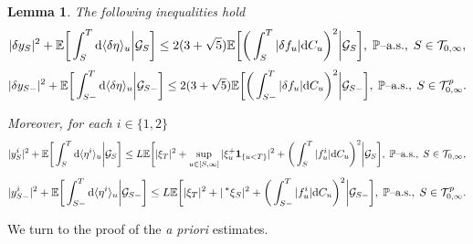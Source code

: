 \documentclass[10pt]{article} %
\newtheorem{lemma}[theorem]{Lemma}
\newcommand\cG{\mathcal G}
\newcommand\cT{\mathcal T}
\def \E{\mathbb{E}}
\def \P{\mathbb{P}}
\newcommand{\brs}[1]{\prescript{\ast}{}{#1}}
\def\d{\mathrm{d}}
\begin{document}
\begin{lemma}\label{lem::cond_estimates}
	The following inequalities hold
		\begin{equation}\label{eq::cond_deltaeta0}
			|\delta y_S|^2 + \E \bigg[ \int_S^T \d \langle \delta \eta \rangle_u \bigg| \cG_S \bigg] \leq 2(3 + \sqrt{5}) \E\bigg[ \bigg( \int_S^T |\delta f_u| \d C_u\bigg)^2 \bigg| \cG_S \bigg],\; \text{$\P$\rm--a.s.}, \; S \in \cT_{0,\infty},
		\end{equation}
		\begin{equation}\label{eq::cond_deltaeta_pred0}
			|\delta y_{S-}|^2 + \E \bigg[ \int_{S-}^T \d \langle \delta \eta \rangle_u \bigg| \cG_{S-} \bigg] \leq 2(3 + \sqrt{5}) \E\bigg[ \bigg( \int_{S-}^T |\delta f_u| \d C_u\bigg)^2 \bigg| \cG_{S-} \bigg],\; \text{$\P$\rm--a.s.}, \; S \in \cT^p_{0,\infty}.
		\end{equation}
		
		Moreover, for each $i \in \{1,2\}$
		\begin{align}\label{eq::cond_eta1}
			 |y^i_S|^2 + \E\bigg[ \int_S^T \d \langle \eta^i \rangle_u \bigg| \cG_S \bigg] \leq L \E\bigg[ |\xi_T|^2 + \sup_{u \in [S,\infty]} |\xi^+_u \mathbf{1}_{\{u < T\}}|^2 + \bigg(\int_S^T |f^i_u| \d C_u\bigg)^2 \bigg| \cG_S \bigg],\; \text{$\P$\rm--a.s.}, \; S \in \cT_{0,\infty},
		\end{align}
		\begin{equation}\label{eq::cond_eta1_pred}
			 |y^i_{S-}|^2 + \E\bigg[ \int_{S-}^T \d \langle \eta^i \rangle_u \bigg| \cG_{S-} \bigg] \leq L \E\bigg[ |\xi_T|^2 + |\brs{\xi}_S|^2 + \bigg(\int_{S-}^T |f^i_u| \d C_u\bigg)^2 \bigg| \cG_{S-} \bigg],\; \text{$\P$\rm--a.s.}, \; S \in \cT^p_{0,\infty}.
		\end{equation}
\end{lemma}

\medskip
We turn to the proof of the \emph{a priori} estimates.
\end{document}
